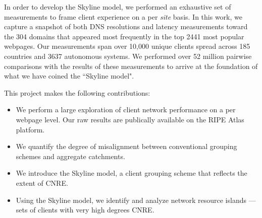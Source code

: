 
In order to develop the Skyline model, we performed an exhaustive set of measurements to frame
client experience on a per \emph{site} basis. In this work, we capture a
snapshot of both DNS resolutions and latency measurements toward the 304 domains that appeared most
frequently in the top 2441 most popular webpages. Our measurements span over 10,000 unique
clients spread across 185 countries and 3637 autonomous systems. We performed over 52 million pairwise
comparisons with the results of these measurements to arrive at the foundation of what we have
coined the ``Skyline model". 

This project makes the following contributions: %

\begin{itemize}%
    \item We perform a large exploration of client network performance on a per webpage level. Our
        raw results are publically available on the RIPE Atlas platform.
    \item  We quantify the degree of misalignment between conventional grouping schemes
        and aggregate catchments.
    \item  We introduce the Skyline model, a client grouping scheme that reflects the
        extent of CNRE.
    \item  Using the Skyline model, we identify and analyze network resource islands --- 
        sets of clients with very high degrees CNRE. 
\end{itemize}

